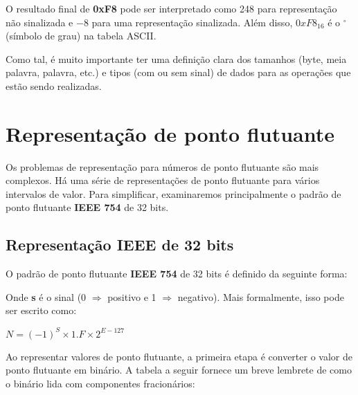 \vspace{5mm}

O resultado final de \textbf{0xF8} pode ser interpretado como 248 para representação não sinalizada e $ -8 $ para uma representação sinalizada. Além disso, $ 0xF8_{16} $ é o $^{\circ}$ (símbolo de grau) na tabela ASCII.

Como tal, é muito importante ter uma definição clara dos tamanhos (byte, meia palavra, palavra, etc.) e tipos (com ou sem sinal) de dados para as operações que estão sendo realizadas.

\section{Representação de ponto flutuante}
Os problemas de representação para números de ponto flutuante são mais complexos. Há uma série de representações de ponto flutuante para vários intervalos de valor. Para simplificar, examinaremos principalmente o padrão de ponto flutuante \textbf{IEEE 754} de 32 bits.

\subsection{Representação IEEE de 32 bits}
O padrão de ponto flutuante\textbf{ IEEE 754} de 32 bits é definido da seguinte forma:

\noindent
{}

Onde \textbf{s} é o sinal (0 $\Rightarrow $ positivo e 1 $ \Rightarrow $  negativo). Mais formalmente, isso pode ser escrito como:
\begin{center}
	$ N = (-1)^S \times 1.F \times 2^{E-127} $
\end{center}

Ao representar valores de ponto flutuante, a primeira etapa é converter o valor de ponto flutuante em binário. A tabela a seguir fornece um breve lembrete de como o binário lida com componentes fracionários:


